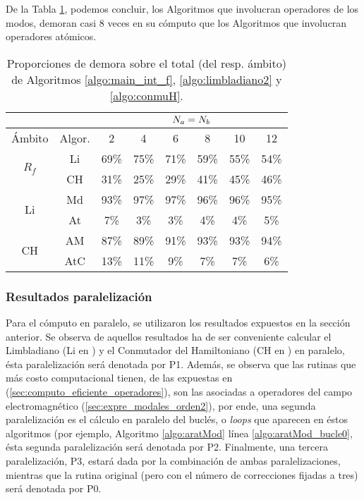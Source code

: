 \qquad De la Tabla \ref{tabla:proporciones_tiempo_F_lim_conmu}, podemos concluir, los Algoritmos que involucran operadores de los modos, demoran casi 8 veces en su c\'omputo que los Algoritmos que involucran operadores at\'omicos.

\begin{table}[h]
 \centering
\begin{tabular}{|c|c|c|c|c|c|c|c|}
\hline \multicolumn{2}{|c|}{} &\multicolumn{6}{|c|}{$N_a=N_b$}\\
\hline \'Ambito& Algor. & 2&4&6&8&10&12\\
\hline \multirow{2}{*}{$R_f$} 	& Li & 69\% & 75\% & 71\% & 59\% & 55\% & 54\%\\
\cline{2-8} 			& CH & 31\% & 25\% & 29\% & 41\% & 45\% & 46\%\\
\hline \multirow{2}{*}{Li} 	& Md & 93\% & 97\% & 97\% & 96\% & 96\% & 95\%\\
\cline{2-8} 			& At & 7\% & 3\% & 3\% & 4\% & 4\% & 5\%\\
\hline \multirow{2}{*}{CH} 	& AM & 87\% & 89\% & 91\% & 93\% & 93\% & 94\%\\
\cline{2-8} 			& AtC & 13\% & 11\% & 9\% & 7\% & 7\% & 6\%\\
\hline
\end{tabular}\caption{Proporciones de demora sobre el total (del resp. \'ambito)\\ de Algoritmos \ref{algo:main_int_f}, \ref{algo:limbladiano2} y \ref{algo:conmuH}.}\label{tabla:proporciones_tiempo_F_lim_conmu}
\end{table}

\subsubsection{Resultados paralelizaci\'on}
\qquad Para el c\'omputo en paralelo, se utilizaron los resultados expuestos en la secci\'on anterior. Se observa de aquellos resultados ha de ser conveniente calcular el Limbladiano (Li en \label{tabla:proporciones_tiempo_F_lim_conmu}) y el Conmutador del Hamiltoniano (CH en \label{tabla:proporciones_tiempo_F_lim_conmu}) en paralelo, \'esta paralelizaci\'on ser\'a denotada por P1. Adem\'as, se observa que las rutinas que m\'as costo computacional tienen, de las expuestas en (\ref{sec:computo_eficiente_operadores}), son las asociadas a operadores del campo electromagn\'etico (\ref{sec:expre_modales_orden2}), por ende, una segunda paralelizaci\'on es el c\'alculo en paralelo del bucl\'es, o \emph{loops} que aparecen en \'estos algoritmos (por ejemplo, Algoritmo \ref{algo:aratMod} l\'inea \ref{algo:aratMod_bucle0}, \'esta segunda paralelizaci\'on ser\'a denotada por P2. Finalmente, una tercera paralelizaci\'on, P3, estar\'a dada por la combinaci\'on de ambas paralelizaciones, mientras que la rutina original (pero con el n\'umero de correcciones fijadas a tres) ser\'a denotada por P0.\\

